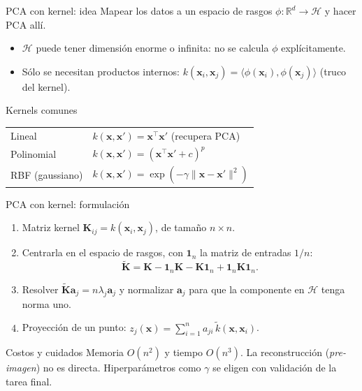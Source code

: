 \documentclass[aspectratio=169,11pt]{beamer}
\newcommand{\R}{\mathbb{R}}
\newcommand{\x}{\bm{x}}
\begin{document}
\begin{frame}{PCA con kernel: idea}
  Mapear los datos a un espacio de rasgos $\phi:\R^d\to\mathcal{H}$ y hacer PCA allí.
  \vspace{4pt}
  \begin{itemize}
    \item $\mathcal{H}$ puede tener dimensión enorme o infinita: no se calcula $\phi$ explícitamente.
    \item Sólo se necesitan productos internos:
          $k(\x_i,\x_j) = \langle\phi(\x_i),\phi(\x_j)\rangle$ (\alert{truco del kernel}).
  \end{itemize}
  \begin{block}{Kernels comunes}
    \begin{tabular}{@{}ll@{}}
      Lineal      & $k(\x,\x') = \x^\top\x'$ \quad (recupera PCA)\\
      Polinomial  & $k(\x,\x') = (\x^\top\x' + c)^p$ \\
      RBF (gaussiano) & $k(\x,\x') = \exp\!\left(-\gamma\lVert\x-\x'\rVert^2\right)$
    \end{tabular}
  \end{block}
\end{frame}

\begin{frame}{PCA con kernel: formulación}
  \begin{enumerate}
    \item Matriz kernel $\mathbf{K}_{ij} = k(\x_i,\x_j)$, de tamaño $n\times n$.
    \item Centrarla en el espacio de rasgos, con $\mathbf{1}_n$ la matriz de entradas $1/n$:
          \[
            \tilde{\mathbf{K}} = \mathbf{K} - \mathbf{1}_n\mathbf{K} - \mathbf{K}\mathbf{1}_n
                                + \mathbf{1}_n\mathbf{K}\mathbf{1}_n .
          \]
    \item Resolver $\tilde{\mathbf{K}}\bm{a}_j = n\lambda_j\bm{a}_j$ y normalizar
          $\bm{a}_j$ para que la componente en $\mathcal{H}$ tenga norma uno.
    \item Proyección de un punto: $z_j(\x) = \sum_{i=1}^{n} a_{ji}\,\tilde{k}(\x,\x_i)$.
  \end{enumerate}
  \begin{alertblock}{Costos y cuidados}
    Memoria $O(n^2)$ y tiempo $O(n^3)$. La reconstrucción (\emph{pre-imagen}) no es directa.
    Hiperparámetros como $\gamma$ se eligen con validación de la tarea final.
  \end{alertblock}
\end{frame}
\end{document}
